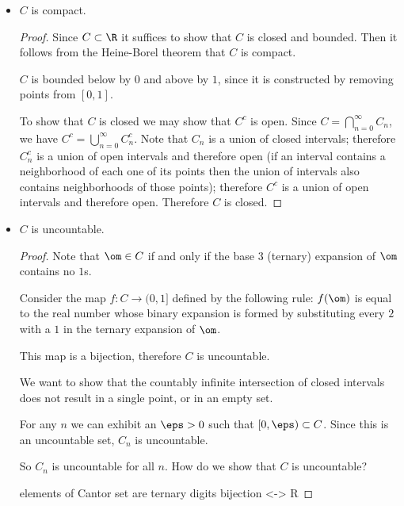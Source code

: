 \begin{itemize}
\item
  \begin{claim*}
    $C$ is compact.
  \end{claim*}
  \begin{proof} 
    Since $C \subset \R$ it suffices to show that $C$ is closed and bounded. Then it follows from the Heine-Borel
    theorem that $C$ is compact.

    $C$ is bounded below by $0$ and above by $1$, since it is constructed by removing points from $[0, 1]$.

    To show that $C$ is closed we may show that $C^c$ is open. Since $C = \bigcap_{n=0}^\infty C_n$, we
    have $C^c = \bigcup_{n=0}^\infty C_n^c$. Note that $C_n$ is a union of closed intervals; therefore $C_n^c$
    is a union of open intervals and therefore open (if an interval contains a neighborhood of each one of its
    points then the union of intervals also contains neighborhoods of those points); therefore $C^c$ is a union
    of open intervals and therefore open. Therefore $C$ is closed.
  \end{proof}

\item
  \begin{claim*}
    $C$ is uncountable.
  \end{claim*}

  \begin{proof} 
    Note that $\om \in C$ if and only if the base 3 (ternary) expansion of $\om$ contains no $1$s.

    Consider the map $f:C \to (0, 1]$ defined by the following rule: $f(\om)$ is equal to the real number whose
    binary expansion is formed by substituting every $2$ with a $1$ in the ternary expansion of $\om$.

    This map is a bijection, therefore $C$ is uncountable.


    We want to show that the countably infinite intersection of closed intervals does not result in a single
    point, or in an empty set.

    For any $n$ we can exhibit an $\eps > 0$ such that $[0, \eps) \subset C$. Since this is an uncountable set, $C_n$ is uncountable.

    So $C_n$ is uncountable for all $n$. How do we show that $C$ is uncountable?

    elements of Cantor set are ternary digits bijection <-> R


\end{proof}
\end{itemize}
